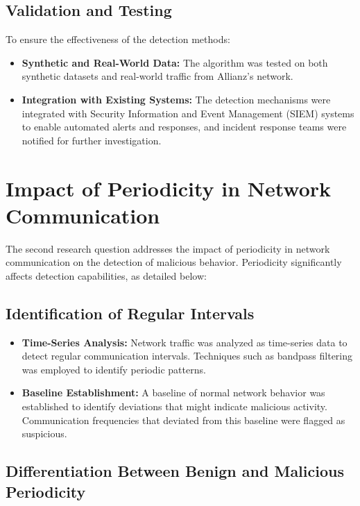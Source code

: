 \subsection{Validation and Testing}

To ensure the effectiveness of the detection methods:
\begin{itemize}
    \item \textbf{Synthetic and Real-World Data:} The algorithm was tested on both synthetic datasets and real-world traffic from Allianz’s network.
    \item \textbf{Integration with Existing Systems:} The detection mechanisms were integrated with Security Information and Event Management (SIEM) systems to enable automated alerts and responses, and incident response teams were notified for further investigation.
\end{itemize}

\section{Impact of Periodicity in Network Communication}

The second research question addresses the impact of periodicity in network communication on the detection of malicious behavior. Periodicity significantly affects detection capabilities, as detailed below:

\subsection{Identification of Regular Intervals}

\begin{itemize}
    \item \textbf{Time-Series Analysis:} Network traffic was analyzed as time-series data to detect regular communication intervals. Techniques such as bandpass filtering was employed to identify periodic patterns.
    \item \textbf{Baseline Establishment:} A baseline of normal network behavior was established to identify deviations that might indicate malicious activity. Communication frequencies that deviated from this baseline were flagged as suspicious.
\end{itemize}

\subsection{Differentiation Between Benign and Malicious Periodicity}

